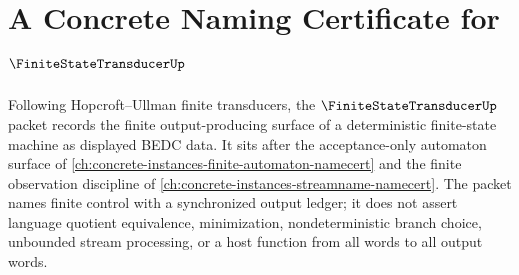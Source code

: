 \chapter{A Concrete Naming Certificate for $\FiniteStateTransducerUp$}
\label{ch:concrete-instances-finite-state-transducer-namecert}

Following Hopcroft--Ullman finite transducers, the $\FiniteStateTransducerUp$ packet records the finite output-producing surface of a deterministic finite-state machine as displayed BEDC data. It sits after the acceptance-only automaton surface of \autoref{ch:concrete-instances-finite-automaton-namecert} and the finite observation discipline of \autoref{ch:concrete-instances-streamname-namecert}. The packet names finite control with a synchronized output ledger; it does not assert language quotient equivalence, minimization, nondeterministic branch choice, unbounded stream processing, or a host function from all words to all output words.


